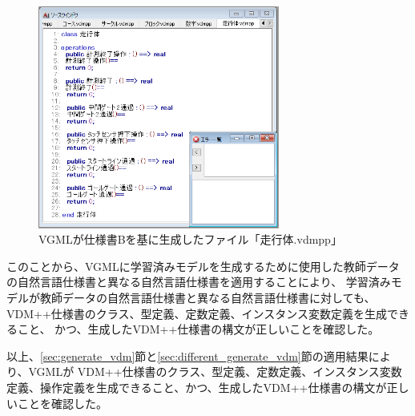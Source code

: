 \begin{figure}[tp]
    \begin{center}
    \includegraphics[width=300]{image/indicationB_vdm6.PNG}
    \caption{VGMLが仕様書Bを基に生成したファイル「走行体.vdmpp」}
    \label{fig:indicationB_vdm6}
    \end{center}
\end{figure}

このことから、VGMLに学習済みモデルを生成するために使用した教師データの自然言語仕様書と異なる自然言語仕様書を適用することにより、
学習済みモデルが教師データの自然言語仕様書と異なる自然言語仕様書に対しても、
VDM++仕様書のクラス、型定義、定数定義、インスタンス変数定義を生成できること、
かつ、生成したVDM++仕様書の構文が正しいことを確認した。

以上、\ref{sec:generate_vdm}節と\ref{sec:different_generate_vdm}節の適用結果により、VGMLが
VDM++仕様書のクラス、型定義、定数定義、インスタンス変数定義、操作定義を生成できること、かつ、生成したVDM++仕様書の構文が正しいことを確認した。
